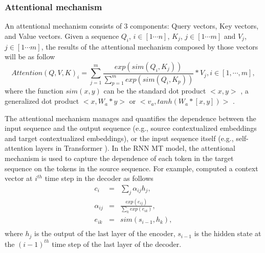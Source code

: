 \subsubsection{Attentional mechanism \label{ssec:attention}}
An attentional mechanism consists of 3 components: Query vectors, Key vectors, and Value vectors. Given a sequence $Q_i$, $i \in [1 \cdots n]$, $K_j$, $j \in [1 \cdots m]$ and $V_j$, $j \in [1 \cdots m]$, the results
of the attentional mechanism composed by those vectors will be as follow
\begin{equation}
Attention(Q,V,K)_i = \displaystyle{\mathop{\sum}_{j=1}^{m}} \frac{exp(sim(Q_i,K_j))}{\displaystyle{\mathop{\sum}_{p=1}^{m}}exp(sim(Q_i,K_p))}*V_j, i \in [1, \cdots, m],
\end{equation}
where the function $sim(x,y)$ can be the standard dot product $<x,y>$ \citep{Vaswani17attention}, a generalized dot product $<x,W_a*y>$ or $<v_a, tanh(W_a*[x,y])>$ \citep{Luong15stanford, Bahdanau15learning}.

The attentional mechanism manages and quantifies the dependence between the input sequence and the output sequence (e.g., source contextualized embeddings and target contextualized embeddings), or the input sequence itself (e.g., self-attention layers in Transformer \citep{Vaswani17attention}). In the RNN MT model, the attentional mechanism is used to capture the dependence of each token in the target sequence on the tokens in the source sequence. For example, \citet{Bahdanau15learning} computed a context vector at $i^{th}$ time step in the decoder as follows
\begin{equation}
\begin{array}{rcl}
c_i &=& \sum_{j} \alpha_{ij} h_j, \\
\alpha_{ij} &=& \frac{exp(e_{ij})}{\sum_{k}exp(e_{ik})}, \\
e_{ik} &=& sim(s_{i-1},h_k),\\
\end{array}
\end{equation}
where $h_j$ is the output of the last layer of the encoder, $s_{i-1}$ is the hidden state at the $(i-1)^{th}$ time step of the last layer of the decoder. 


